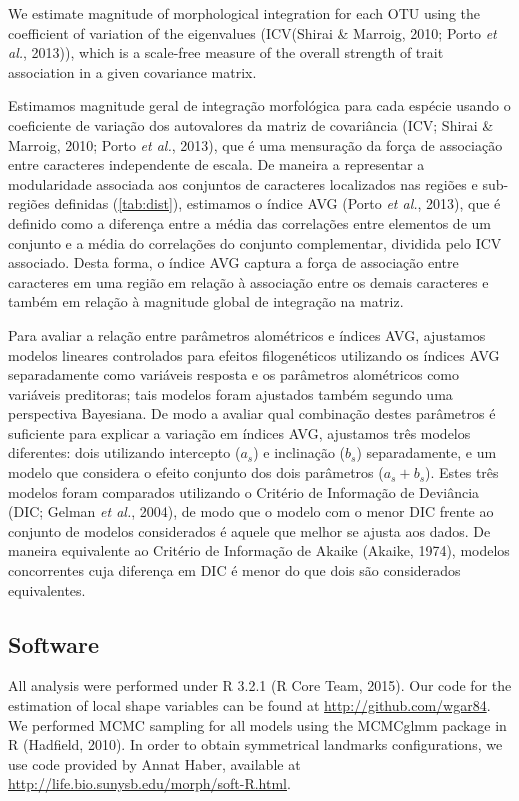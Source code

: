 \documentclass[12pt,]{article}
\begin{document}
We estimate magnitude of morphological integration for each OTU using
the coefficient of variation of the eigenvalues (ICV(Shirai \& Marroig,
2010; Porto \emph{et al.}, 2013)), which is a scale-free measure of the
overall strength of trait association in a given covariance matrix.

Estimamos magnitude geral de integração morfológica para cada espécie
usando o coeficiente de variação dos autovalores da matriz de
covariância (ICV; Shirai \& Marroig, 2010; Porto \emph{et al.}, 2013),
que é uma mensuração da força de associação entre caracteres
independente de escala. De maneira a representar a modularidade
associada aos conjuntos de caracteres localizados nas regiões e
sub-regiões definidas (\autoref{tab:dist}), estimamos o índice AVG
(Porto \emph{et al.}, 2013), que é definido como a diferença entre a
média das correlações entre elementos de um conjunto e a média do
correlações do conjunto complementar, dividida pelo ICV associado. Desta
forma, o índice AVG captura a força de associação entre caracteres em
uma região em relação à associação entre os demais caracteres e também
em relação à magnitude global de integração na matriz.

Para avaliar a relação entre parâmetros alométricos e índices AVG,
ajustamos modelos lineares controlados para efeitos filogenéticos
utilizando os índices AVG separadamente como variáveis resposta e os
parâmetros alométricos como variáveis preditoras; tais modelos foram
ajustados também segundo uma perspectiva Bayesiana. De modo a avaliar
qual combinação destes parâmetros é suficiente para explicar a variação
em índices AVG, ajustamos três modelos diferentes: dois utilizando
intercepto ($a_s$) e inclinação ($b_s$) separadamente, e um modelo que
considera o efeito conjunto dos dois parâmetros ($a_s + b_s$). Estes
três modelos foram comparados utilizando o Critério de Informação de
Deviância (DIC; Gelman \emph{et al.}, 2004), de modo que o modelo com o
menor DIC frente ao conjunto de modelos considerados é aquele que melhor
se ajusta aos dados. De maneira equivalente ao Critério de Informação de
Akaike (Akaike, 1974), modelos concorrentes cuja diferença em DIC é
menor do que dois são considerados equivalentes.

\subsection{Software}\label{software}

All analysis were performed under R 3.2.1 (R Core Team, 2015). Our code
for the estimation of local shape variables can be found at
\url{http://github.com/wgar84}. We performed MCMC sampling for all
models using the MCMCglmm package in R (Hadfield, 2010). In order to
obtain symmetrical landmarks configurations, we use code provided by
Annat Haber, available at
\url{http://life.bio.sunysb.edu/morph/soft-R.html}.
\end{document}
